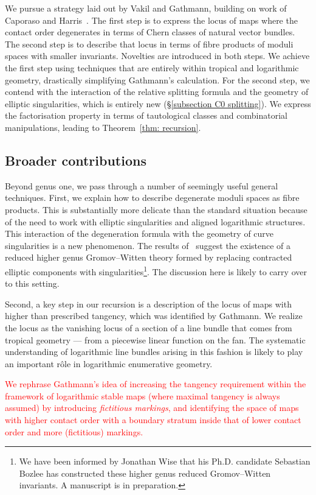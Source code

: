 \documentclass[11pt]{amsart}
\newcommand{\tred}{\textcolor{red}}
\theoremstyle{definition}
\theoremstyle{definition}
\begin{document}
We pursue a strategy laid out by Vakil and Gathmann, building on work of Caporaso and Harris~\cite{CH98,Ga,Vre}. The first step is to express the locus of maps where the contact order degenerates in terms of Chern classes of natural vector bundles. The second step is to describe that locus in terms of fibre products of moduli spaces with smaller invariants. Novelties are introduced in both steps. We achieve the first step using techniques that are entirely within tropical and logarithmic geometry, drastically simplifying Gathmann's calculation. For the second step, we contend with the interaction of the relative splitting formula and the geometry of elliptic singularities, which is entirely new (\S \ref{subsection C0 splitting}). We express the factorisation property in terms of tautological classes and combinatorial manipulations, leading to Theorem~\ref{thm: recursion}.

\subsection{Broader contributions} Beyond genus one, we pass through a number of seemingly useful general techniques. First, we explain how to describe degenerate moduli spaces as fibre products. This is substantially more delicate than the standard situation because of the need to work with elliptic singularities and aligned logarithmic structures. This interaction of the degeneration formula with the geometry of curve singularities is a new phenomenon. The results of~\cite{RSPW} suggest the existence of a reduced higher genus Gromov--Witten theory formed by replacing contracted elliptic components with singularities\footnote{We have been informed by Jonathan Wise that his Ph.D. candidate Sebastian Bozlee has constructed these higher genus reduced Gromov--Witten invariants. A manuscript is in preparation.}. The discussion here is likely to carry over to this setting.

Second, a key step in our recursion is a description of the locus of maps with higher than prescribed tangency, which was identified by Gathmann. We realize the locus as the vanishing locus of a section of a line bundle that comes from tropical geometry — from a piecewise linear function on the fan. The systematic understanding of logarithmic line bundles arising in this fashion is likely to play an important r\^ole in logarithmic enumerative geometry.

\tred{We rephrase Gathmann's idea of increasing the tangency requirement within the framework of logarithmic stable maps (where maximal tangency is always assumed) by introducing \emph{fictitious markings}, and identifying the space of maps with higher contact order with a boundary stratum inside that of lower contact order and more (fictitious) markings.}
\end{document}
